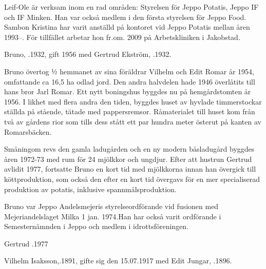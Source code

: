 Leif-Ole är verksam inom en rad områden: Styrelsen för Jeppo Potatis, Jeppo IF och IF Minken. Han var också medlem i den första styrelsen för Jeppo Food. Sambon Kristina har varit anställd på kontoret vid Jeppo Potatis mellan åren 1993--. För tillfället arbetar hon fr.om. 2009 på Arbetskliniken i Jakobstad.






Bruno, .1932, gift 1956 med Gertrud Ekström, .1932.
\begin{jhchildren}
   \item {}
   \item {}
   \item {}
   \item {}
\end{jhchildren}
Bruno övertog ½ hemmanet av sina föräldrar Vilhelm och  Edit Romar år 1954, omfattande ca 16,5 ha odlad jord. Den andra halvdelen hade 1946 överlåtits till hans bror Jarl Romar. Ett nytt boningshus byggdes nu på hemgårdstomten år 1956. I likhet med flera andra den tiden, byggdes huset av hyvlade timmerstockar ställda på stående, tätade med pappersremsor. Råmaterialet till huset kom från två av gårdens rior som tills dess stått ett par hundra meter österut på kanten av Romarsbäcken.

Småningom revs den gamla ladugården och en ny modern båsladugård byggdes åren 1972-73 med rum för 24 mjölkkor och ungdjur. Efter att hustrun Gertrud avlidit 1977, fortsatte Bruno en kort tid med mjölkkorna innan han övergick till köttproduktion, som också den efter en kort tid övergavs för en mer specialiserad produktion av potatis, inklusive spannmålsproduktion.

Bruno var Jeppo Andelsmejeris styrelseordförande vid fusionen med Mejeriandelslaget Milka 1 jan. 1974.Han har också varit ordförande i Semesternämnden i Jeppo och medlem i idrottsföreningen.

Gertrud .1977





Vilhelm Isaksson,.1891, gifte sig den 15.07.1917 med Edit Jungar, .1896.

